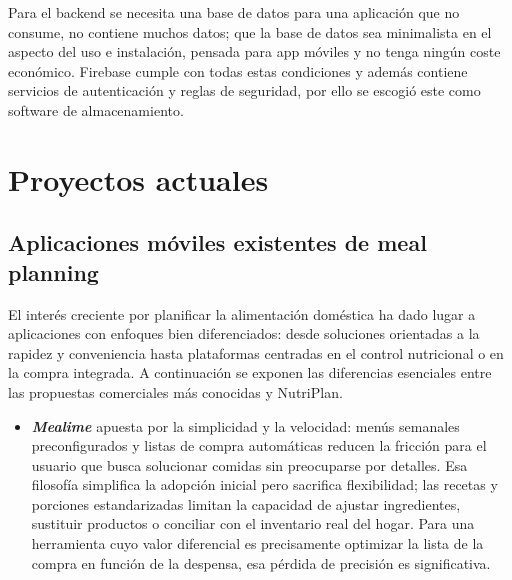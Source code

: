 \documentclass[twoside, openright, 11pt]{report}
\begin{document}
\begin{enumerate}
		Para el backend se necesita una base de datos para una aplicación que no consume, no contiene muchos datos; que la base de datos sea minimalista en el aspecto del uso e instalación, pensada para app móviles y no tenga ningún coste económico. Firebase cumple con todas estas condiciones y además contiene servicios de autenticación y reglas de seguridad, por ello se escogió este como software de almacenamiento.
		
		
  	
	\section{Proyectos actuales}
		\subsection*{Aplicaciones móviles existentes de meal planning}
		El interés creciente por planificar la alimentación doméstica ha dado lugar a aplicaciones con enfoques bien diferenciados: desde soluciones orientadas a la rapidez y conveniencia hasta plataformas centradas en el control nutricional o en la compra integrada. A continuación se exponen las diferencias esenciales entre las propuestas comerciales más conocidas y NutriPlan.
		
		\begin{itemize}
			\item \textit{\textbf{Mealime}} apuesta por la simplicidad y la velocidad: menús semanales preconfigurados y listas de compra automáticas reducen la fricción para el usuario que busca solucionar comidas sin preocuparse por detalles. Esa filosofía simplifica la adopción inicial pero sacrifica flexibilidad; las recetas y porciones estandarizadas limitan la capacidad de ajustar ingredientes, sustituir productos o conciliar con el inventario real del hogar. Para una herramienta cuyo valor diferencial es precisamente optimizar la lista de la compra en función de la despensa, esa pérdida de precisión es significativa.
			

\end{itemize}
\end{enumerate}
\end{document}
